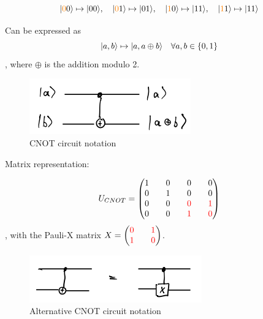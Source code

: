 \begin{equation*}
    \lvert{\color{orange}0}0\rangle \mapsto \lvert00\rangle, 
    \quad \lvert{\color{orange}0}1\rangle \mapsto \lvert01\rangle, 
    \quad \lvert{\color{orange}1}0\rangle \mapsto \lvert11\rangle, 
    \quad \lvert{\color{orange}1}1\rangle \mapsto \lvert11\rangle
\end{equation*}

Can be expressed as
\begin{equation}
    \lvert a, b\rangle \mapsto \lvert a, a \oplus b\rangle \quad \forall a, b \in \{0, 1\}
\end{equation}
, where $\oplus$ is the addition modulo 2.

\begin{figure}[h]
    \centering
    \includegraphics[scale=0.5]{chapters/res/cnot-circuit.png}
    \caption{CNOT circuit notation}
\end{figure}

Matrix representation:

\begin{equation}
    U_{CNOT} = \begin{pmatrix*}
        1 && 0 && 0 && 0 \\
        0 && 1 && 0 && 0 \\
        0 && 0 && \color{red} 0 && \color{red} 1 \\
        0 && 0 && \color{red} 1 && \color{red} 0 \\
    \end{pmatrix*}
\end{equation},
with the Pauli-X matrix $X = \begin{pmatrix*}
        \color{red} 0 && \color{red} 1 \\
        \color{red} 1 && \color{red} 0 \\
\end{pmatrix*}$.
 
\begin{figure}[h]
    \centering
    \includegraphics[scale=0.5]{chapters/res/cnot-alternative-circuit.png}
    \caption{Alternative CNOT circuit notation}
\end{figure}

